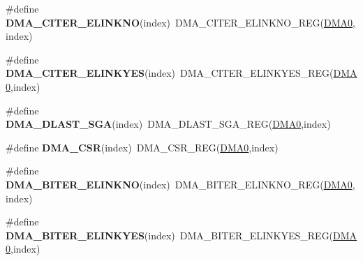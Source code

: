 \begin{DoxyCompactItemize}
\item 
\#define {\bfseries D\+M\+A\+\_\+\+C\+I\+T\+E\+R\+\_\+\+E\+L\+I\+N\+K\+NO}(index)~D\+M\+A\+\_\+\+C\+I\+T\+E\+R\+\_\+\+E\+L\+I\+N\+K\+N\+O\+\_\+\+R\+EG(\hyperlink{group__DMA__Peripheral__Access__Layer_ga4103044f9ca209772f513dc694513ffb}{D\+M\+A0},index)\hypertarget{group__DMA__Register__Accessor__Macros_gaa43fe51df00c21f4267edeedbbb6e68e}{}\label{group__DMA__Register__Accessor__Macros_gaa43fe51df00c21f4267edeedbbb6e68e}

\item 
\#define {\bfseries D\+M\+A\+\_\+\+C\+I\+T\+E\+R\+\_\+\+E\+L\+I\+N\+K\+Y\+ES}(index)~D\+M\+A\+\_\+\+C\+I\+T\+E\+R\+\_\+\+E\+L\+I\+N\+K\+Y\+E\+S\+\_\+\+R\+EG(\hyperlink{group__DMA__Peripheral__Access__Layer_ga4103044f9ca209772f513dc694513ffb}{D\+M\+A0},index)\hypertarget{group__DMA__Register__Accessor__Macros_ga554e01071bdc2ac1279190af717f19d6}{}\label{group__DMA__Register__Accessor__Macros_ga554e01071bdc2ac1279190af717f19d6}

\item 
\#define {\bfseries D\+M\+A\+\_\+\+D\+L\+A\+S\+T\+\_\+\+S\+GA}(index)~D\+M\+A\+\_\+\+D\+L\+A\+S\+T\+\_\+\+S\+G\+A\+\_\+\+R\+EG(\hyperlink{group__DMA__Peripheral__Access__Layer_ga4103044f9ca209772f513dc694513ffb}{D\+M\+A0},index)\hypertarget{group__DMA__Register__Accessor__Macros_gace4dc3fb97989651bf0f8f4bd9ff4df9}{}\label{group__DMA__Register__Accessor__Macros_gace4dc3fb97989651bf0f8f4bd9ff4df9}

\item 
\#define {\bfseries D\+M\+A\+\_\+\+C\+SR}(index)~D\+M\+A\+\_\+\+C\+S\+R\+\_\+\+R\+EG(\hyperlink{group__DMA__Peripheral__Access__Layer_ga4103044f9ca209772f513dc694513ffb}{D\+M\+A0},index)\hypertarget{group__DMA__Register__Accessor__Macros_gafb40df597acc18705ae2b222e2dcfb6b}{}\label{group__DMA__Register__Accessor__Macros_gafb40df597acc18705ae2b222e2dcfb6b}

\item 
\#define {\bfseries D\+M\+A\+\_\+\+B\+I\+T\+E\+R\+\_\+\+E\+L\+I\+N\+K\+NO}(index)~D\+M\+A\+\_\+\+B\+I\+T\+E\+R\+\_\+\+E\+L\+I\+N\+K\+N\+O\+\_\+\+R\+EG(\hyperlink{group__DMA__Peripheral__Access__Layer_ga4103044f9ca209772f513dc694513ffb}{D\+M\+A0},index)\hypertarget{group__DMA__Register__Accessor__Macros_gaecaa21525c6216080d34aee5345f6a79}{}\label{group__DMA__Register__Accessor__Macros_gaecaa21525c6216080d34aee5345f6a79}

\item 
\#define {\bfseries D\+M\+A\+\_\+\+B\+I\+T\+E\+R\+\_\+\+E\+L\+I\+N\+K\+Y\+ES}(index)~D\+M\+A\+\_\+\+B\+I\+T\+E\+R\+\_\+\+E\+L\+I\+N\+K\+Y\+E\+S\+\_\+\+R\+EG(\hyperlink{group__DMA__Peripheral__Access__Layer_ga4103044f9ca209772f513dc694513ffb}{D\+M\+A0},index)\hypertarget{group__DMA__Register__Accessor__Macros_gaaff1ce654846e1e435a07ad784055a98}{}\label{group__DMA__Register__Accessor__Macros_gaaff1ce654846e1e435a07ad784055a98}


\end{DoxyCompactItemize}
